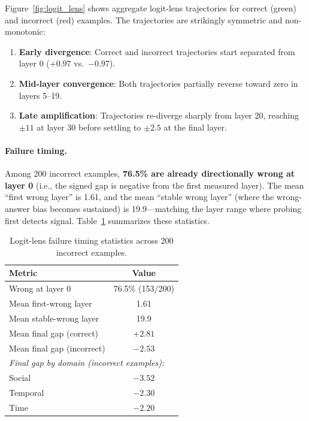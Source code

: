 \documentclass{article}
\begin{document}
Figure~\ref{fig:logit_lens} shows aggregate logit-lens trajectories for correct (green) and incorrect (red) examples. The trajectories are strikingly symmetric and non-monotonic:

\begin{enumerate}
    \item \textbf{Early divergence}: Correct and incorrect trajectories start separated from layer 0 ($+0.97$ vs.\ $-0.97$).
    \item \textbf{Mid-layer convergence}: Both trajectories partially reverse toward zero in layers 5--19.
    \item \textbf{Late amplification}: Trajectories re-diverge sharply from layer 20, reaching $\pm11$ at layer 30 before settling to $\pm2.5$ at the final layer.
\end{enumerate}

\paragraph{Failure timing.} Among 200 incorrect examples, \textbf{76.5\% are already directionally wrong at layer 0} (i.e., the signed gap is negative from the first measured layer). The mean ``first wrong layer'' is 1.61, and the mean ``stable wrong layer'' (where the wrong-answer bias becomes sustained) is 19.9—matching the layer range where probing first detects signal. Table~\ref{tab:logit_lens_timing} summarizes these statistics.

\begin{table}[t]
\centering
\small
\caption{Logit-lens failure timing statistics across 200 incorrect examples.}
\label{tab:logit_lens_timing}
\begin{tabular}{lc}
\toprule
\textbf{Metric} & \textbf{Value} \\
\midrule
Wrong at layer 0 & 76.5\% (153/200) \\
Mean first-wrong layer & 1.61 \\
Mean stable-wrong layer & 19.9 \\
Mean final gap (correct) & $+2.81$ \\
Mean final gap (incorrect) & $-2.53$ \\
\midrule
\multicolumn{2}{l}{\textit{Final gap by domain (incorrect examples):}} \\
Social & $-3.52$ \\
Temporal & $-2.30$ \\
Time & $-2.20$ \\
\bottomrule
\end{tabular}
\end{table}
\end{document}

